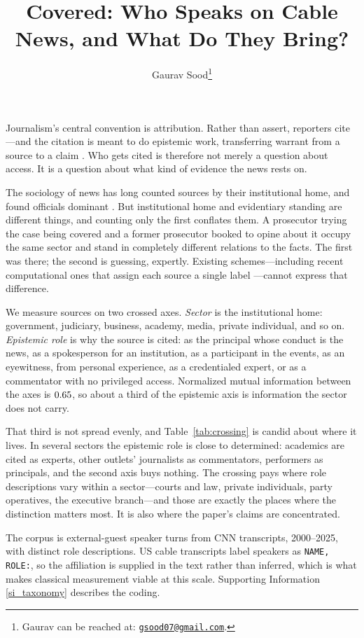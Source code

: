 \documentclass[12pt, letterpaper]{article}
\title{Covered: Who Speaks on Cable News, and What Do They Bring?\\\vspace{10mm}}
\author{Gaurav Sood\thanks{Gaurav can be reached at:
  \href{mailto:gsood07@gmail.com}{\texttt{gsood07@gmail.com}}.}}
\begin{document}
\maketitle
\doublespacing

Journalism's central convention is attribution. Rather than assert, reporters
cite---and the citation is meant to do epistemic work, transferring warrant from
a source to a claim \citep{tuchman1972}. Who gets cited is therefore not merely
a question about access. It is a question about what kind of evidence the news
rests on.

The sociology of news has long counted sources by their institutional home, and
found officials dominant \citep{sigal1973, gans1979, bennett1990}. But
institutional home and evidentiary standing are different things, and counting
only the first conflates them. A prosecutor trying the case being covered and a
former prosecutor booked to opine about it occupy the same sector and stand in
completely different relations to the facts. The first was there; the second is
guessing, expertly. Existing schemes---including recent computational ones that
assign each source a single label \citep{morlan2025, spangher2024}---cannot
express that difference.

We measure sources on two crossed axes. \emph{Sector} is the institutional home:
government, judiciary, business, academy, media, private individual, and so on.
\emph{Epistemic role} is why the source is cited: as the principal whose conduct
is the news, as a spokesperson for an institution, as a participant in the
events, as an eyewitness, from personal experience, as a credentialed expert, or
as a commentator with no privileged access. Normalized mutual information
between the axes is $0.65$, so about a third of the epistemic axis is
information the sector does not carry.

That third is not spread evenly, and Table~\ref{tab:crossing} is candid about
where it lives. In several sectors the epistemic role is close to determined:
academics are cited as experts, other outlets' journalists as commentators,
performers as principals, and the second axis buys nothing. The crossing pays
where role descriptions vary within a sector---courts and law, private
individuals, party operatives, the executive branch---and those are exactly the
places where the distinction matters most. It is also where the paper's claims
are concentrated.

The corpus is \GuestTurns{} external-guest speaker turns from CNN transcripts,
2000--2025, with \DistinctRoles{} distinct role descriptions. US cable
transcripts label speakers as \texttt{NAME, ROLE:}, so the affiliation is
supplied in the text rather than inferred, which is what makes classical
measurement viable at this scale. Supporting Information \ref{si_taxonomy}
describes the coding.
\end{document}
